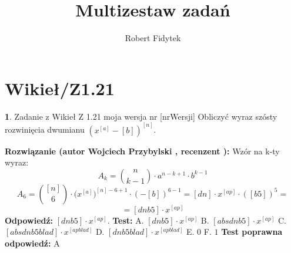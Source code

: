 \documentclass[12pt, a4paper]{article}
\title{Multizestaw zadań}
\author{Robert Fidytek}
\date{}
\theoremstyle{definition} %
\newtheorem{zad}{}
\newcommand{\kategoria}[1]{\section{#1}} %
\newcommand{\zadStart}[1]{\begin{zad}#1\newline} %
\newcommand{\zadStop}{\end{zad}}   %
\newcommand{\rozwStart}[2]{\noindent \textbf{Rozwiązanie (autor #1 , recenzent #2): }\newline} %
\newcommand{\rozwStop}{\newline}                                            %
\newcommand{\odpStart}{\noindent \textbf{Odpowiedź:}\newline}    %
\newcommand{\odpStop}{\newline}                                             %
\newcommand{\testStart}{\noindent \textbf{Test:}\newline} %
\newcommand{\testStop}{\newline} %
\newcommand{\kluczStart}{\noindent \textbf{Test poprawna odpowiedź:}\newline} %
\newcommand{\kluczStop}{\newline} %
\begin{document}
\maketitle


\kategoria{Wikieł/Z1.21}
\zadStart{Zadanie z Wikieł Z 1.21  moja wersja nr [nrWersji]}
Obliczyć wyraz szósty rozwinięcia dwumianu $(x^{[a]}-[b])^{[n]}$.
\zadStop
\rozwStart{Wojciech Przybylski}{}
Wzór na k-ty wyraz:
$$A_{k}={n\choose k-1}\cdot a^{n-k+1}\cdot b^{k-1}$$
$$A_{6}={[n]\choose 6}\cdot \big(x^{[a]}\big)^{[n]-6+1}\cdot (-[b])^{6-1}=[dn]\cdot x^{[ap]}\cdot ([b5])^{5}=$$
$$=[dnb5]\cdot x^{[ap]}$$
\rozwStop
\odpStart
$[dnb5]\cdot x^{[ap]}$.
\odpStop
\testStart
A. $[dnb5]\cdot x^{[ap]}$
B. $[absdnb5]\cdot x^{[ap]}$
C. $[absdnb5blad]\cdot x^{[apblad]}$
D. $[dnb5blad]\cdot x^{[apblad]}$
E. $0$
F. $1$
\testStop
\kluczStart
A
\kluczStop
\end{document}
